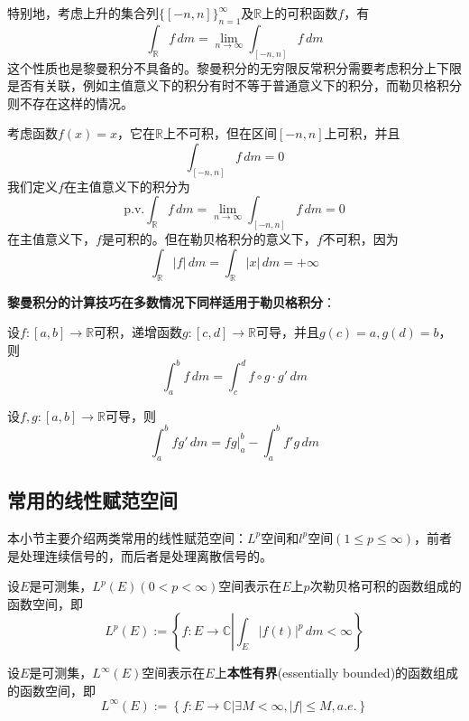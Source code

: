 \documentclass{ctexbook}
\newcommand{\evalat}[3]{\left.#1\right|_{#2}^{#3}}
\begin{document}
特别地，考虑上升的集合列$\{[-n,n]\}_{n=1}^{\infty}$及$\mathbb{R}$上的可积函数$f$，有
\[\int_{\mathbb{R}}f\,dm=\lim_{n\to\infty}\int_{[-n,n]}f\,dm\]
这个性质也是黎曼积分不具备的。黎曼积分的无穷限反常积分需要考虑积分上下限是否有关联，例如主值意义下的积分有时不等于普通意义下的积分，而勒贝格积分则不存在这样的情况。

\begin{example}
    考虑函数$f(x)=x$，它在$\mathbb{R}$上不可积，但在区间$[-n,n]$上可积，并且\[\int_{[-n,n]}f\,dm=0\]
    我们定义$f$在主值意义下的积分为
    \[\text{p.v.}\int_{\mathbb{R}}f\,dm=\lim_{n\to\infty}\int_{[-n,n]}f\,dm=0\]
    在主值意义下，$f$是可积的。但在勒贝格积分的意义下，$f$不可积，因为
    \[\int_{\mathbb{R}}|f|\,dm=\int_{\mathbb{R}}|x|\,dm=+\infty\]
\end{example}

\textbf{黎曼积分的计算技巧在多数情况下同样适用于勒贝格积分}：
\begin{theorem}[勒贝格积分的变量代换]
    设$f:[a,b]\to\mathbb{R}$可积，递增函数$g:[c,d]\to \mathbb{R}$可导，并且$g(c)=a,g(d)=b$，则
    \[\int_{a}^{b}f\,dm=\int_{c}^{d}f\circ g\cdot g'\,dm\]
\end{theorem}

\begin{theorem}[勒贝格积分的分部积分法]
    设$f,g:[a,b]\to\mathbb{R}$可导，则
    \[\int_{a}^{b}f g'\,dm=\evalat{fg}{a}{b}-\int_{a}^{b}f' g\,dm\]
\end{theorem}

\subsection{常用的线性赋范空间}\label{sub:Lp_space}

本小节主要介绍两类常用的线性赋范空间：$L^p$空间和$l^p$空间$(1\leq p\leq \infty)$，前者是处理连续信号的，而后者是处理离散信号的。

\begin{definition}[$L^p$空间]
    设$E$是可测集，$L^p(E)(0<p<\infty)$空间表示在$E$上$p$次勒贝格可积的函数组成的函数空间，即
    \[L^p(E):=\left\{f:E\rightarrow \mathbb{C} \left| \int_{E}|f(t)|^p\,dm<\infty\right.\right\}\]
\end{definition}

\begin{definition}[$L^{\infty}$空间]
    设$E$是可测集，$L^{\infty}(E)$空间表示在$E$上\textbf{本性有界}(essentially bounded)的函数组成的函数空间，即
    \[L^{\infty}(E):=\left\{f:E\rightarrow \mathbb{C} \left|\exists M<\infty,|f|\leq M,a.e.\right.\right\}\]
\end{definition}
\end{document}
